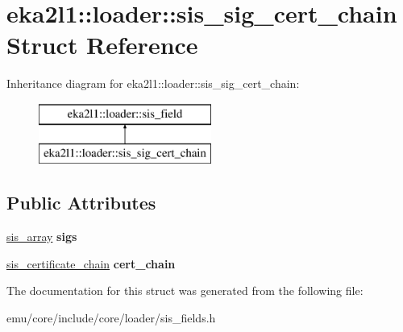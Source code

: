 \hypertarget{structeka2l1_1_1loader_1_1sis__sig__cert__chain}{}\section{eka2l1\+:\+:loader\+:\+:sis\+\_\+sig\+\_\+cert\+\_\+chain Struct Reference}
\label{structeka2l1_1_1loader_1_1sis__sig__cert__chain}
Inheritance diagram for eka2l1\+:\+:loader\+:\+:sis\+\_\+sig\+\_\+cert\+\_\+chain\+:\begin{figure}[H]
\begin{center}
\leavevmode
\includegraphics[height=2.000000cm]{structeka2l1_1_1loader_1_1sis__sig__cert__chain}
\end{center}
\end{figure}
\subsection*{Public Attributes}
\begin{DoxyCompactItemize}
\item 
\mbox{\label{structeka2l1_1_1loader_1_1sis__sig__cert__chain_a49c63750681ecc3b1f17fc1e19cf63e2}} 
\mbox{\hyperlink{structeka2l1_1_1loader_1_1sis__array}{sis\+\_\+array}} {\bfseries sigs}
\item 
\mbox{\label{structeka2l1_1_1loader_1_1sis__sig__cert__chain_a40e059cccd8230d86ce41f6d5560c675}} 
\mbox{\hyperlink{structeka2l1_1_1loader_1_1sis__certificate__chain}{sis\+\_\+certificate\+\_\+chain}} {\bfseries cert\+\_\+chain}
\end{DoxyCompactItemize}


The documentation for this struct was generated from the following file\+:\begin{DoxyCompactItemize}
\item 
emu/core/include/core/loader/sis\+\_\+fields.\+h\end{DoxyCompactItemize}
